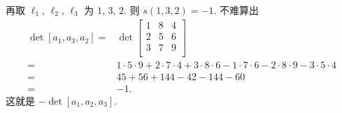 \documentclass[../libro.tex]{subfiles}
\begin{document}
\begin{example}
    再取 \(\ell_1\), \(\ell_2\), \(\ell_3\)
    为 \(1\), \(3\), \(2\).
    则 \(s(1, 3, 2) = -1\).
    不难算出
    \begin{align*}
        \det {[a_1, a_3, a_2]}
        = {} &
        \det {
            \begin{bmatrix}
                1 & 8 & 4 \\
                2 & 5 & 6 \\
                3 & 7 & 9 \\
        \end{bmatrix}}
        \\
        = {} &
        1 \cdot 5 \cdot 9 + 2 \cdot 7 \cdot 4 + 3 \cdot 8 \cdot 6
        - 1 \cdot 7 \cdot 6 - 2 \cdot 8 \cdot 9 - 3 \cdot 5 \cdot 4
        \\
        = {} &
        45 + 56 + 144 - 42 - 144 - 60
        \\
        = {} &
        {-} 1.
    \end{align*}
    这就是 \(- \det {[a_1, a_2, a_3]}\).
\end{example}
\end{document}

